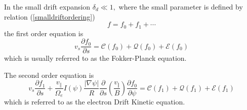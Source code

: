In the small drift expansion $\delta _{d}\ll 1,$ where the small parameter
is defined by relation (\ref{smalldriftordering})
\begin{equation}
f=f_{0}+f_{1}+\cdots
\end{equation}
the first order equation is
\begin{equation}
v_{s}\frac{\partial f_{0}}{\partial s}=\mathcal{C}\left( f_{0}\right) +%
\mathcal{Q}\left( f_{0}\right) +\mathcal{E}\left( f_{0}\right)
\end{equation}
which is usually referred to as the Fokker-Planck equation.

The second order equation is
\begin{equation}
v_{s}\frac{\partial f_{1}}{\partial s}+\frac{v_{\Vert }}{\Omega _{e}}I\left(
\psi \right) \frac{\left| \nabla \psi \right| }{R}\frac{\partial }{\partial s%
}\left( \frac{v_{\Vert }}{B}\right) \frac{\partial f_{0}}{\partial \psi }=%
\mathcal{C}\left( f_{1}\right) +\mathcal{Q}\left( f_{1}\right) +\mathcal{E}%
\left( f_{1}\right)
\end{equation}
which is referred to as the electron Drift Kinetic equation.
